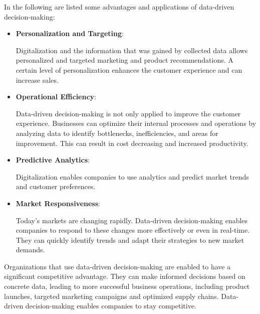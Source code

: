 \documentclass[a4]{scrartcl}
\begin{document}
	In the following are listed some advantages and applications of data-driven decision-making:
	
	\begin{itemize}
				
		
		\item \textbf{Personalization and Targeting}: 
		
		Digitalization and the information that was gained by collected data allows personalized and targeted marketing and product recommendations. A certain level of personalization enhances the customer experience and can increase sales.~\cite{socialmedia, DDDM}
		
		\item \textbf{Operational Efficiency}: 
		
		Data-driven decision-making is not only applied to improve the customer experience. Businesses can optimize their internal processes and operations by analyzing data to identify bottlenecks, inefficiencies, and areas for improvement. This can result in cost decreasing and increased productivity.~\cite{DDDM}
		
		\item \textbf{Predictive Analytics}: 
		
		Digitalization enables companies to use analytics and predict market trends and customer preferences.~\cite{DDDM, masterthesis, leadingdigital}

		
		\item \textbf{Market Responsiveness}: 
		
		Today's markets are changing rapidly. Data-driven decision-making enables companies to respond to these changes more effectively or even in real-time. They can quickly identify trends and adapt their strategies to new market demands.~\cite{DDDM, digitalmatrix, leadingdigital}
		
		
	\end{itemize}
	
	
	Organizations that use data-driven decision-making are enabled to have a significant competitive advantage. They can make informed decisions based on concrete data, leading to more successful business operations, including product launches, targeted marketing campaigns and optimized supply chains.
	Data-driven decision-making enables companies to stay competitive.~\cite{DDDM, digitalmatrix, leadingdigital}
	



\end{document}
